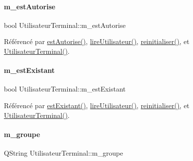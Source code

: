 \paragraph{\texorpdfstring{m\+\_\+est\+Autorise}{m\_estAutorise}}
{\footnotesize\ttfamily bool Utilisateur\+Terminal\+::m\+\_\+est\+Autorise\hspace{0.3cm}{\ttfamily [private]}}



Référencé par \hyperlink{class_utilisateur_terminal_a6cd16c268f5ab545fc2b62f1e29a9917}{est\+Autorise()}, \hyperlink{class_utilisateur_terminal_a196420ecc14bc0645e3e1c66d796b8e6}{lire\+Utilisateur()}, \hyperlink{class_utilisateur_terminal_a63b37fa7cbf08976e5a09cbfbdb55f42}{reinitialiser()}, et \hyperlink{class_utilisateur_terminal_a3a4e47b0f67f67f2396671941688d036}{Utilisateur\+Terminal()}.

\mbox{\label{class_utilisateur_terminal_a6b16983fcb2b0f1f698f595309a67828}} 
\paragraph{\texorpdfstring{m\+\_\+est\+Existant}{m\_estExistant}}
{\footnotesize\ttfamily bool Utilisateur\+Terminal\+::m\+\_\+est\+Existant\hspace{0.3cm}{\ttfamily [private]}}



Référencé par \hyperlink{class_utilisateur_terminal_aa80e532db6a898bf1aa433ffb34f2389}{est\+Existant()}, \hyperlink{class_utilisateur_terminal_a196420ecc14bc0645e3e1c66d796b8e6}{lire\+Utilisateur()}, \hyperlink{class_utilisateur_terminal_a63b37fa7cbf08976e5a09cbfbdb55f42}{reinitialiser()}, et \hyperlink{class_utilisateur_terminal_a3a4e47b0f67f67f2396671941688d036}{Utilisateur\+Terminal()}.

\mbox{\label{class_utilisateur_terminal_a824944eb7dc8689a0b0ecfa2fc9e4e6c}} 
\paragraph{\texorpdfstring{m\+\_\+groupe}{m\_groupe}}
{\footnotesize\ttfamily Q\+String Utilisateur\+Terminal\+::m\+\_\+groupe\hspace{0.3cm}{\ttfamily [private]}}



